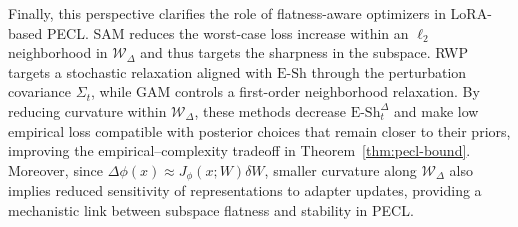 \documentclass{article}
\theoremstyle{plain}
\theoremstyle{definition}
\theoremstyle{remark}
\begin{document}
Finally, this perspective clarifies the role of flatness-aware optimizers in LoRA-based PECL. SAM reduces the worst-case loss increase within an $\ell_2$ neighborhood in $\mathcal{W}_\Delta$ and thus targets the sharpness in the subspace. RWP targets a stochastic relaxation aligned with $\mathrm{E\text{-}Sh}$ through the perturbation covariance $\Sigma_t$, while GAM controls a first-order neighborhood relaxation. By reducing curvature within $\mathcal{W}_\Delta$, these methods decrease $\mathrm{E\text{-}Sh}_t^\Delta$ and make low empirical loss compatible with posterior choices that remain closer to their priors, improving the empirical–complexity tradeoff in Theorem~\ref{thm:pecl-bound}. Moreover, since $\Delta\phi(x)\approx J_\phi(x;W)\delta W$, smaller curvature along $\mathcal{W}_\Delta$ also implies reduced sensitivity of representations to adapter updates, providing a mechanistic link between subspace flatness and stability in PECL.















\end{document}
